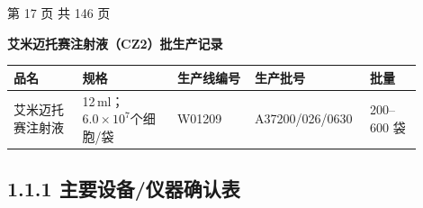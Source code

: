 \documentclass[UTF8,10pt,a4paper,fontset=fandol]{ctexart}
\newcommand{\fieldvalue}[1]{#1}
\newcommand{\handwritten}[1]{#1}
\begin{document}
\begin{center}
第 17 页 共 146 页
\end{center}

\newpage

\begin{center}
\textbf{艾米迈托赛注射液（CZ2）批生产记录}
\end{center}

\begin{tabular}{|p{0.16\linewidth}|p{0.22\linewidth}|p{0.18\linewidth}|p{0.22\linewidth}|p{0.12\linewidth}|}
\hline
品名 & 规格 & 生产线编号 & 生产批号 & 批量 \\
\hline
艾米迈托赛注射液 &
12\,ml；$6.0\times10^7$个细胞/袋 &
\fieldvalue{\handwritten{W01209}} &
\fieldvalue{\handwritten{A37200/026/0630}} &
200--600 袋 \\
\hline
\end{tabular}

\subsection*{1.1.1 主要设备/仪器确认表}
\end{document}
